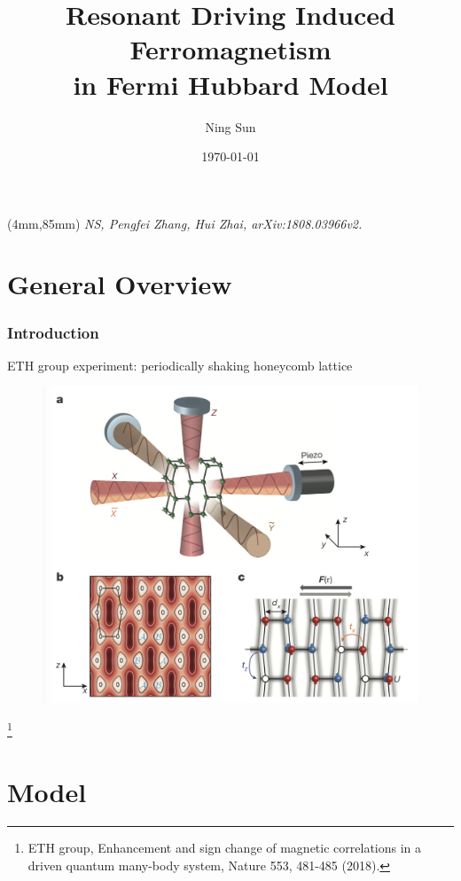 \documentclass[]{beamer}
\newenvironment{reference}[2]
    {\begin{textblock*}{\textwidth}(#1,#2)
        \footnotesize\it\bgroup\color{red!50!black}}
    {\egroup\end{textblock*}}
\begin{document}
\title{Resonant Driving Induced Ferromagnetism \\ in Fermi Hubbard Model}
\author{Ning Sun}
\date{\today}

\begin{frame}

    {
        \titlepage
    }
    
    \begin{reference}{4mm}{85mm}
        NS, Pengfei Zhang, Hui Zhai, arXiv:1808.03966v2.
    \end{reference}
\end{frame}


\section{General Overview}
\small
\begin{frame}\frametitle{Introduction}
\begin{block}{ETH group experiment: periodically shaking honeycomb lattice}
\begin{figure}
    \centering
    \includegraphics[width=0.5\columnwidth]{figs/eth.png}
\end{figure}
\footnote{ETH group, Enhancement and sign change of magnetic correlations in a 
    driven quantum many-body system, Nature 553, 481-485 (2018).}
\end{block}

\end{frame}


\section{Model}
\end{document}
